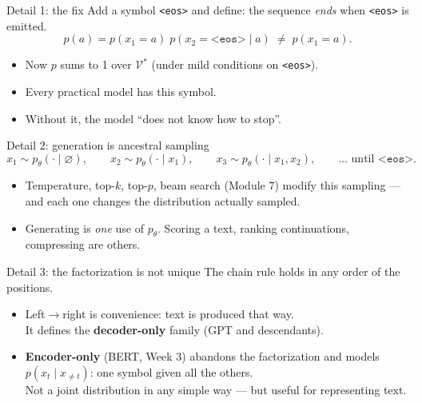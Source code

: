 \documentclass[11pt,aspectratio=169]{beamer}
\newcommand{\V}{\mathcal{V}}
\newcommand{\ptheta}{p_{\theta}}
\newcommand{\dest}[1]{\textcolor{structure}{\textbf{#1}}}
\newcommand{\eos}{\texttt{<eos>}}
\begin{document}
\begin{frame}{Detail 1: the fix}
  Add a symbol \eos{} and define: the sequence \emph{ends} when \eos{} is emitted.
  \[
    p(a) = p(x_1 = a)\;p(x_2 = \eos \mid a) \;\neq\; p(x_1 = a).
  \]

  \vspace{0.8em}
  \begin{itemize}
    \item Now $p$ sums to 1 over $\V^{*}$ (under mild conditions on \eos).
    \item Every practical model has this symbol.
    \item Without it, the model ``does not know how to stop''.
  \end{itemize}
\end{frame}

\begin{frame}{Detail 2: generation is ancestral sampling}
  \[
    x_1\sim\ptheta(\cdot\mid\varnothing),\qquad
    x_2\sim\ptheta(\cdot\mid x_1),\qquad
    x_3\sim\ptheta(\cdot\mid x_1,x_2),\qquad \dots \text{ until } \eos .
  \]

  \vspace{0.8em}
  \begin{itemize}
    \item Temperature, top-$k$, top-$p$, beam search (Module 7) modify this sampling ---
          and each one changes the distribution actually sampled.
    \item Generating is \emph{one} use of $\ptheta$. Scoring a text, ranking continuations,
          compressing are others.
  \end{itemize}
\end{frame}

\begin{frame}{Detail 3: the factorization is not unique}
  The chain rule holds in any order of the positions.

  \vspace{0.8em}
  \begin{itemize}
    \item Left$\to$right is convenience: text is produced that way.\\
          It defines the \dest{decoder-only} family (GPT and descendants).
    \item \dest{Encoder-only} (BERT, Week 3) abandons the factorization and models
          $p(x_t\mid x_{\neq t})$: one symbol given all the others.\\
          Not a joint distribution in any simple way --- but useful for representing text.
  \end{itemize}
\end{frame}
\end{document}
